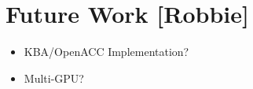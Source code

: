 \section{Future Work [Robbie]}
\begin{itemize}
  \item KBA/OpenACC Implementation?
  \item Multi-GPU?
\end{itemize}

